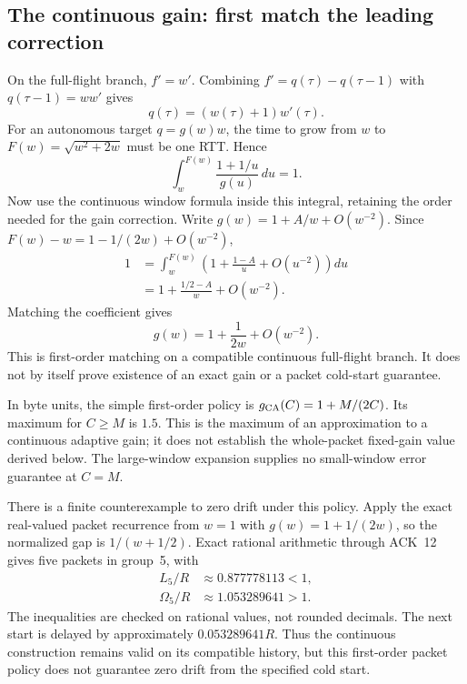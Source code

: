 \documentclass[sigconf,nonacm]{acmart}
\begin{document}
\subsection{The continuous gain: first match the leading correction}
On the full-flight branch, $f'=w'$. Combining
$f'=q(\tau)-q(\tau-1)$ with $q(\tau-1)=ww'$ gives
\begin{equation}
 q(\tau)=(w(\tau)+1)w'(\tau).
 \label{eq:cafillrate}
\end{equation}
For an autonomous target $q=g(w)w$, the time to grow from $w$ to
$F(w)=\sqrt{w^2+2w}$ must be one RTT. Hence
\begin{equation}
 \int_w^{F(w)}\frac{1+1/u}{g(u)}\,du=1.
 \label{eq:cagainintegral}
\end{equation}
Now use the continuous window formula inside this integral, retaining
the order needed for the gain correction. Write
$g(w)=1+A/w+O(w^{-2})$. Since
$F(w)-w=1-1/(2w)+O(w^{-2})$,
\begin{equation}\begin{aligned}
 1&=\int_w^{F(w)}\left(1+\frac{1-A}{u}+O(u^{-2})\right)du\\
  &=1+\frac{1/2-A}{w}+O(w^{-2}).
\end{aligned}\end{equation}
Matching the coefficient gives
\begin{equation}
 \boxed{g(w)=1+\frac1{2w}+O(w^{-2}).}
 \label{eq:cagain}
\end{equation}
This is first-order matching on a compatible continuous full-flight
branch. It does not by itself prove existence of an exact gain or a
packet cold-start guarantee.

In byte units, the simple first-order policy is $g_{\rm CA}(C)=1+M/(2C)$. Its maximum for $C\ge M$ is $1.5$. This is the maximum of an approximation to a continuous adaptive gain; it does not establish the whole-packet fixed-gain value derived below. The large-window expansion supplies no small-window error guarantee at $C=M$.

There is a finite counterexample to zero drift under this policy. Apply the exact real-valued packet recurrence from $w=1$ with $g(w)=1+1/(2w)$, so the normalized gap is $1/(w+1/2)$. Exact rational arithmetic through ACK~12 gives five packets in group~5, with
\begin{equation}\begin{aligned}
 L_5/R&\approx0.877778113<1,\\
 \Omega_5/R&\approx1.053289641>1.
\end{aligned}\label{eq:capolicywitness}\end{equation}
The inequalities are checked on rational values, not rounded decimals. The next start is delayed by approximately $0.053289641R$. Thus the continuous construction remains valid on its compatible history, but this first-order packet policy does not guarantee zero drift from the specified cold start.
\end{document}
